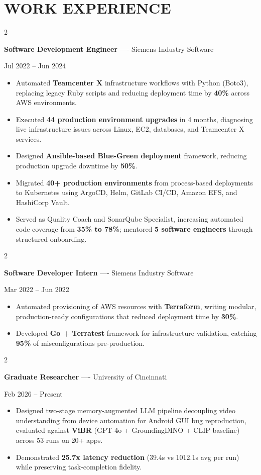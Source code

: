 \documentclass[10pt, letterpaper]{article}
\newenvironment{highlights}{
    \begin{itemize}[
        topsep=0.10 cm,
        parsep=0.06 cm,
        partopsep=0pt,
        itemsep=0.06 cm,
        leftmargin=12pt
    ]
}{
    \end{itemize}
}
\newenvironment{twocolentry}[2][]{
    \onecolentry
    \def\secondColumn{#2}
    \setcolumnwidth{\fill, 4.5 cm}
    \begin{paracol}{2}
}{
    \switchcolumn \raggedleft \secondColumn
    \end{paracol}
    \endonecolentry
}
\begin{document}
\section{WORK EXPERIENCE}
\begin{twocolentry}{Jul 2022 -- Jun 2024}
\textbf{Software Development Engineer} ---- Siemens Industry Software
\end{twocolentry}
\begin{highlights}
  \item Automated \textbf{Teamcenter X} infrastructure workflows with Python (Boto3), replacing legacy Ruby scripts and reducing deployment time by \textbf{40\%} across AWS environments.
  \item Executed \textbf{44 production environment upgrades} in 4 months, diagnosing live infrastructure issues across Linux, EC2, databases, and Teamcenter X services.
  \item Designed \textbf{Ansible-based Blue-Green deployment} framework, reducing production upgrade downtime by \textbf{50\%}.
  \item Migrated \textbf{40+ production environments} from process-based deployments to Kubernetes using ArgoCD, Helm, GitLab CI/CD, Amazon EFS, and HashiCorp Vault.
  \item Served as Quality Coach and SonarQube Specialist, increasing automated code coverage from \textbf{35\% to 78\%}; mentored \textbf{5 software engineers} through structured onboarding.
\end{highlights}

\vspace{0.15 cm}

\begin{twocolentry}{Mar 2022 -- Jun 2022}
\textbf{Software Developer Intern} ---- Siemens Industry Software
\end{twocolentry}
\begin{highlights}
  \item Automated provisioning of AWS resources with \textbf{Terraform}, writing modular, production-ready configurations that reduced deployment time by \textbf{30\%}.
  \item Developed \textbf{Go + Terratest} framework for infrastructure validation, catching \textbf{95\%} of misconfigurations pre-production.
\end{highlights}

\vspace{0.15 cm}

\begin{twocolentry}{Feb 2026 -- Present}
\textbf{Graduate Researcher} ---- University of Cincinnati
\end{twocolentry}
\begin{highlights}
  \item Designed two-stage memory-augmented LLM pipeline decoupling video understanding from device automation for Android GUI bug reproduction, evaluated against \textbf{ViBR} (GPT-4o + GroundingDINO + CLIP baseline) across 53 runs on 20+ apps.
  \item Demonstrated \textbf{25.7x latency reduction} (39.4s vs 1012.1s avg per run) while preserving task-completion fidelity.
\end{highlights}
\end{document}
